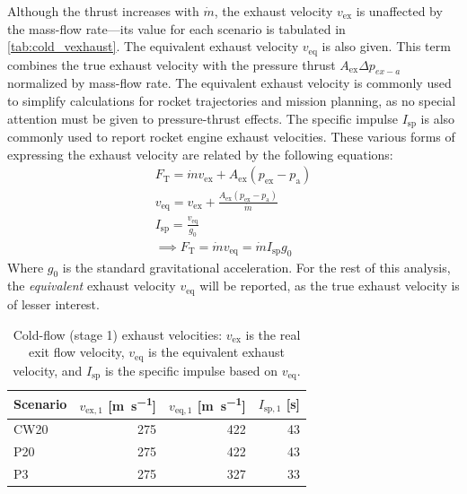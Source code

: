             Although the thrust increases with $\dot{m}$, the exhaust velocity $v_\mathrm{ex}$ is unaffected by the mass-flow rate---its value for each scenario is tabulated in \autoref{tab:cold_vexhaust}. The equivalent exhaust velocity $v_\mathrm{eq}$ is also given. This term combines the true exhaust velocity with the pressure thrust $A_\mathrm{ex}\Delta p_{ex-a}$ normalized by mass-flow rate. The equivalent exhaust velocity is commonly used to simplify calculations for rocket trajectories and mission planning, as no special attention must be given to pressure-thrust effects. The specific impulse $I_\mathrm{sp}$ is also commonly used to report rocket engine exhaust velocities. These various forms of expressing the exhaust velocity are related by the following equations:
            \begin{gather*}
                F_\mathrm{T} = \dot{m}v_\mathrm{ex} + A_\mathrm{ex}(p_\mathrm{ex}-p_\mathrm{a}) \\
                v_\mathrm{eq} = v_\mathrm{ex} + \frac{A_\mathrm{ex}(p_\mathrm{ex}-p_\mathrm{a})}{\dot{m}} \\
                I_\mathrm{sp} = \frac{v_\mathrm{eq}}{g_0} \\
                \implies F_\mathrm{T} = \dot{m}v_\mathrm{eq} = \dot{m}I_\mathrm{sp}g_0
            \end{gather*}
            Where $g_0$ is the standard gravitational acceleration. For the rest of this analysis, the \emph{equivalent} exhaust velocity $v_\mathrm{eq}$ will be reported, as the true exhaust velocity is of lesser interest.

            \begin{table}[h]
                \centering
                \caption[Cold-flow exhaust velocities]{Cold-flow (stage 1) exhaust velocities: $v_\mathrm{ex}$ is the real exit flow velocity, $v_\mathrm{eq}$ is the equivalent exhaust velocity, and $I_\mathrm{sp}$ is the specific impulse based on $v_\mathrm{eq}$.}
                \label{tab:cold_vexhaust}
                \begin{tabular}{@{}lrrr@{}}
                    \toprule
                    Scenario    & $v_\mathrm{ex,1}$ [\unit{m.s^{-1}}] & $v_\mathrm{eq,1}$ [\unit{m.s^{-1}}] & $I_\mathrm{sp,1}$ [s] \\
                    \midrule
                    CW20    & 275   &  422  & 43 \\
                    P20     & 275   &  422  & 43 \\
                    P3      & 275   &  327  & 33 \\
                    \bottomrule
                \end{tabular}
            \end{table}

